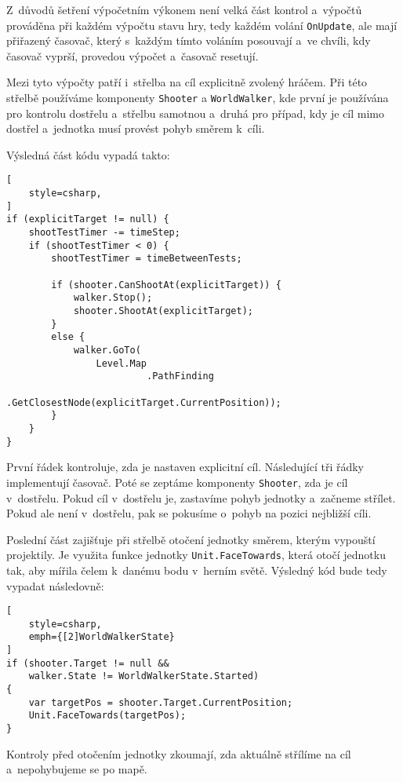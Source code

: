 Z~důvodů šetření výpočetním výkonem není velká část kontrol a~výpočtů prováděna při každém výpočtu stavu hry, tedy každém volání \texttt{OnUpdate}, ale mají přiřazený časovač, který s~každým tímto voláním posouvají a~ve chvíli, kdy časovač vyprší, provedou výpočet a~časovač resetují.

Mezi tyto výpočty patří i~střelba na cíl explicitně zvolený hráčem. Při této střelbě používáme komponenty \texttt{Shooter} a \texttt{WorldWalker}, kde první je používána pro kontrolu dostřelu a~střelbu samotnou a~druhá pro případ, kdy je cíl mimo dostřel a~jednotka musí provést pohyb směrem k~cíli.

Výsledná část kódu vypadá takto:
\begin{lstlisting}[
	style=csharp,
]
if (explicitTarget != null) {
	shootTestTimer -= timeStep;
	if (shootTestTimer < 0) {
		shootTestTimer = timeBetweenTests;

		if (shooter.CanShootAt(explicitTarget)) {
			walker.Stop();
			shooter.ShootAt(explicitTarget);
		}
		else {			
			walker.GoTo(
				Level.Map
						 .PathFinding
						 .GetClosestNode(explicitTarget.CurrentPosition));
		}
	}
}
\end{lstlisting}

První řádek kontroluje, zda je nastaven explicitní cíl. Následující tři řádky implementují časovač. Poté se zeptáme komponenty \texttt{Shooter}, zda je cíl v~dostřelu. Pokud cíl v~dostřelu je, zastavíme pohyb jednotky a~začneme střílet. Pokud ale není v~dostřelu, pak se pokusíme o~pohyb na pozici nejbližší cíli.

Poslední část zajišťuje při střelbě otočení jednotky směrem, kterým vypouští projektily. Je využita funkce jednotky \texttt{Unit.FaceTowards}, která otočí jednotku tak, aby mířila čelem k~danému bodu v~herním světě. Výsledný kód bude tedy vypadat následovně:

\begin{lstlisting}[
	style=csharp,
	emph={[2]WorldWalkerState}
]
if (shooter.Target != null && 
	walker.State != WorldWalkerState.Started) 
{
	var targetPos = shooter.Target.CurrentPosition;
	Unit.FaceTowards(targetPos);
}
\end{lstlisting}

Kontroly před otočením jednotky zkoumají, zda aktuálně střílíme na cíl a~nepohybujeme se po mapě.

